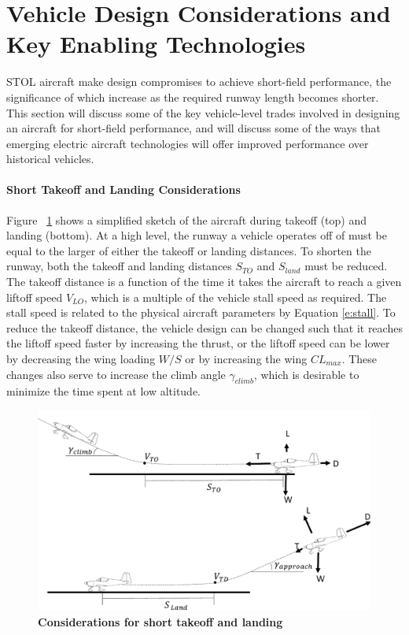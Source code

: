 \documentclass[]{aiaa-tc}%
\begin{document}
\section{Vehicle Design Considerations and Key Enabling Technologies}
STOL aircraft make design compromises to achieve short-field performance, the significance of which increase as the required runway length becomes shorter.  This section will discuss some of the key vehicle-level trades involved in designing an aircraft for short-field performance, and will discuss some of the ways that emerging electric aircraft technologies will offer improved performance over historical vehicles. 

\paragraph{Short Takeoff and Landing Considerations}
Figure ~\ref{f:takeoff} shows a simplified sketch of the aircraft during takeoff (top) and landing (bottom).  At a high level, the runway a vehicle operates off of must be equal to the larger of either the takeoff or landing distances.  To shorten the runway, both the takeoff and landing distances $S_{TO}$ and $S_{land}$ must be reduced.  The takeoff distance is a function of the time it takes the aircraft to reach a given liftoff speed $V_{LO}$, which is a multiple of the vehicle stall speed as required\cite{ASTM3179}.  The stall speed is related to the physical aircraft parameters by Equation \ref{e:stall}.  To reduce the takeoff distance, the vehicle design can be changed such that it reaches the liftoff speed faster by increasing the thrust, or the liftoff speed can be lower by decreasing the wing loading $W/S$ or by increasing the wing $CL_{max}$.  These changes also serve to increase the climb angle $\gamma_{climb}$, which is desirable to minimize the time spent at low altitude. 
\begin{figure}[h!]
	\begin{center}
	\includegraphics[width=1.0\textwidth]{takeoff_fig.pdf}
    \caption{\textbf{Considerations for short takeoff and landing}}
	\label{f:takeoff}
	\end{center}
\end{figure}
\end{document}
